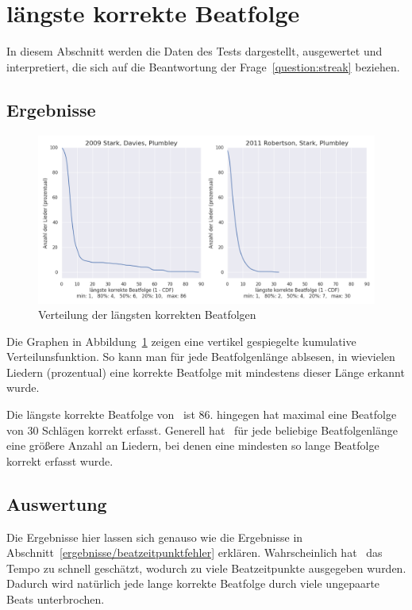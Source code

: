 \section{längste korrekte Beatfolge}
{
	In diesem Abschnitt werden die Daten des Tests dargestellt, ausgewertet und interpretiert,
		die sich auf die Beantwortung der Frage~\ref{question:streak} beziehen.

	\subsection{Ergebnisse}
	{
		\begin{figure}[h]
			\centering
			\includegraphics[scale=0.47]{resources/longest_streak.png}
			\caption{Verteilung der längsten korrekten Beatfolgen}
			\label{fig:longest_streak}
		\end{figure}

		Die Graphen in Abbildung~\ref{fig:longest_streak} zeigen eine vertikel gespiegelte kumulative Verteilunsfunktion.
		So kann man für jede Beatfolgenlänge ablsesen,
			in wievielen Liedern (prozentual) eine korrekte Beatfolge mit mindestens dieser Länge erkannt wurde.

		Die längste korrekte Beatfolge von~\cite{2009_DaPlSt} ist \num{86}.
		\cite{2011_PlRoSt} hingegen hat maximal eine  Beatfolge von \num{30} Schlägen korrekt erfasst.
		Generell hat~\cite{2009_DaPlSt} für jede beliebige Beatfolgenlänge eine größere Anzahl an Liedern,
			bei denen eine mindesten so lange Beatfolge korrekt erfasst wurde.
	}

	\subsection{Auswertung}
	{
		Die Ergebnisse hier lassen sich genauso wie die Ergebnisse in Abschnitt~\ref{ergebnisse/beatzeitpunktfehler} erklären.
		Wahrscheinlich hat~\cite{2011_PlRoSt} das Tempo zu schnell geschätzt,
			wodurch zu viele Beatzeitpunkte ausgegeben wurden.
		Dadurch wird natürlich jede lange korrekte Beatfolge durch viele ungepaarte Beats unterbrochen.
	}

}

